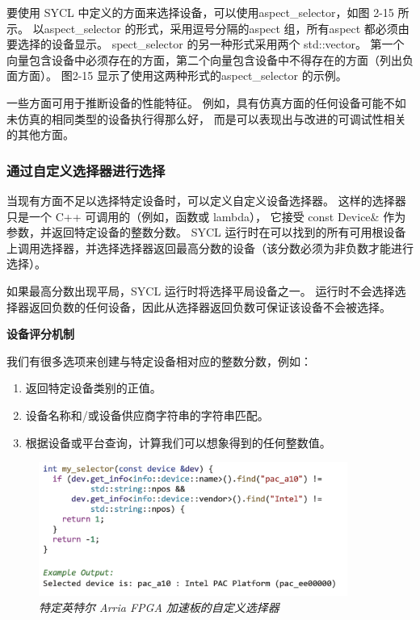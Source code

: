 要使用 SYCL 中定义的方面来选择设备，可以使用aspect\_selector，如图 2-15 所示。 
以aspect\_selector 的形式，采用逗号分隔的aspect 组，所有aspect 都必须由要选择的设备显示。 
spect\_selector 的另一种形式采用两个 std::vector。 
第一个向量包含设备中必须存在的方面，第二个向量包含设备中不得存在的方面（列出负面方面）。 
图2-15 显示了使用这两种形式的aspect\_selector 的示例。

一些方面可用于推断设备的性能特征。 例如，具有仿真方面的任何设备可能不如未仿真的相同类型的设备执行得那么好，
而是可以表现出与改进的可调试性相关的其他方面。

\subsubsection{通过自定义选择器进行选择}
当现有方面不足以选择特定设备时，可以定义自定义设备选择器。 
这样的选择器只是一个 C++ 可调用的（例如，函数或 lambda），
它接受 const Device\& 作为参数，并返回特定设备的整数分数。 
SYCL 运行时在可以找到的所有可用根设备上调用选择器，并选择选择器返回最高分数的设备（该分数必须为非负数才能进行选择）。

如果最高分数出现平局，SYCL 运行时将选择平局设备之一。 
运行时不会选择选择器返回负数的任何设备，因此从选择器返回负数可保证该设备不会被选择。

\textbf{设备评分机制}

我们有很多选项来创建与特定设备相对应的整数分数，例如：

\begin{enumerate}
	\item 返回特定设备类别的正值。

	\item 设备名称和/或设备供应商字符串的字符串匹配。

	\item 根据设备或平台查询，计算我们可以想象得到的任何整数值。
\end{enumerate}

\begin{figure}[H]
	\centering
	\includegraphics[width=0.9\textwidth]{figs/F2.16.png}
	\caption{\textit{特定英特尔 Arria FPGA 加速板的自定义选择器}}
\end{figure}

